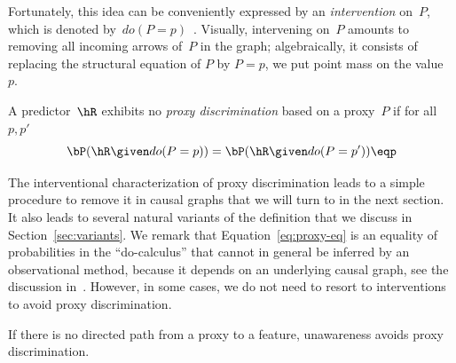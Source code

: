 Fortunately, this idea can be conveniently expressed by an \emph{intervention}
on~$P$, which is denoted by~$do(P=p)$~\cite{Pearl2009}. Visually, intervening
on~$P$ amounts to removing all incoming arrows of~$P$ in the graph;
algebraically, it consists of replacing the structural equation of $P$ by $P=p$,
\ie{} we put point mass on the value~$p$.

\begin{definition}\label{def:overalldisc}
  A predictor~$\hR$ exhibits no \emph{proxy discrimination} based on a proxy~$P$
  if for all~$p, p'$
  \begin{equation}\label{eq:proxy-eq}
    \bP(\hR \given do(P=p) ) = \bP(\hR \given do(P=p') ) \eqp
  \end{equation}
\end{definition}

The interventional characterization of proxy discrimination leads to a simple
procedure to remove it in causal graphs that we will turn to in the next
section. It also leads to several natural variants of the definition that we
discuss in Section~\ref{sec:variants}. We remark that
Equation~\eqref{eq:proxy-eq} is an equality of probabilities in the
``do-calculus'' that cannot in general be inferred by an observational method,
because it depends on an underlying causal graph, see the discussion
in~\cite{Pearl2009}. However, in some cases, we do not need to resort to
interventions to avoid proxy discrimination.

\begin{proposition}\label{pro:unawareness}
  If there is no directed path from a proxy to a feature, unawareness avoids
  proxy discrimination.
\end{proposition}
